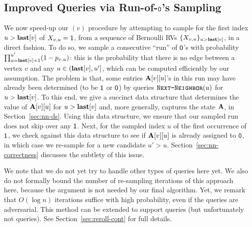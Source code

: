 



\subsection{Improved  Queries via Run-of-$\mathsf{0}$'s Sampling}\label{sec:ER-rand}

We now speed-up our $(v)$ procedure by attempting to sample for the first index $u > \mathbf{last}[v]$ of $X_{v,u}=\mathsf{1}$, from a sequence of Bernoulli RVs $\{X_{v, u}\}_{u > \mathbf{last}[v]}$, in a direct fashion. To do so, we sample a consecutive ``run'' of $\mathsf{0}$'s with probability $\prod_{u=\mathbf{last}[v]+1}^{u'} (1-p_{v,u})$: this is the probability that there is no edge between a vertex $v$ and any $u \in (\mathbf{last}[v],u']$, which can be computed efficiently by our assumption. The problem is that, some entries $\mathbf{A}[v][u]$'s in this run may have already been determined (to be $\mathsf{1}$ or $\mathsf{0}$) by queries $\texttt{\textsc{Next-Neighbor}}(u)$ for $u > \mathbf{last}[v]$. To this end, we give a succinct data structure that determines the value of $\mathbf{A}[v][u]$ for $u >\mathbf{last}[v]$ and, more generally, captures the state $\mathbf{A}$, in Section~\ref{sec:nn-ds}. Using this data structure, we ensure that our sampled run does not skip over any $\mathsf{1}$. Next, for the sampled index $u$ of the first occurrence of $\mathsf{1}$, we check against this data structure to see if $\mathbf{A}[v][u]$ is already assigned to $\mathsf{0}$, in which case we re-sample for a new candidate $u' > u$. Section~\ref{sec:nn-correctness} discusses the subtlety of this issue.

We note that we do not yet try to handle other types of queries here yet. We also do not formally bound the number of re-sampling iterations of this approach here, because the argument is not needed by our final algorithm. Yet, we remark that $O(\log n)$ iterations suffice with high probability, even if the queries are adversarial. This method can be extended to support  queries (but unfortunately not  queries). See Section~\ref{sec:reroll-cont} for full details.

